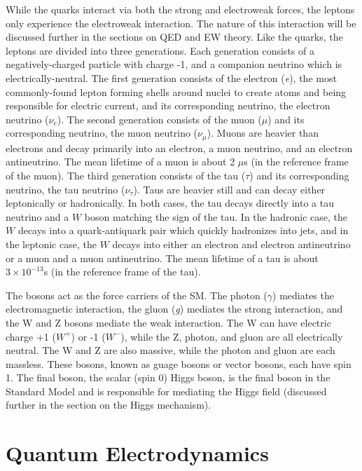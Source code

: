 While the quarks interact via both the strong and electroweak forces, the leptons only experience the electroweak interaction. The nature of this interaction will be discussed further in the sections on QED and EW theory. Like the quarks, the leptons are divided into three generations. Each generation consists of a negatively-charged particle with charge -1, and a companion neutrino which is electrically-neutral. The first generation consists of the electron (\textit{e}), the most commonly-found lepton forming shells around nuclei to create atoms and being responsible for electric current, and its corresponding neutrino, the electron neutrino (\textit{$\nu_{e}$}). The second generation consists of the muon (\textit{$\mu$}) and its corresponding neutrino, the muon neutrino (\textit{$\nu_{\mu}$}). Muons are heavier than electrons and decay primarily into an electron, a muon neutrino, and an electron antineutrino. The mean lifetime of a muon is about 2 $\mu$s (in the reference frame of the muon). The third generation consists of the tau (\textit{$\tau$}) and its corresponding neutrino, the tau neutrino (\textit{$\nu_{\tau}$}). Taus are heavier still and can decay either leptonically or hadronically. In both cases, the tau decays directly into a tau neutrino and a $W$ boson matching the sign of the tau. In the hadronic case, the $W$ decays into a quark-antiquark pair which quickly hadronizes into jets, and in the leptonic case, the $W$ decays into either an electron and electron antineutrino or a muon and a muon antineutrino.  The mean lifetime of a tau is about $3 \times 10^{-13}$s (in the reference frame of the tau)\cite{pdg}.

The bosons act as the force carriers of the SM. The photon (\textit{$\gamma$}) mediates the electromagnetic interaction, the gluon (\textit{g}) mediates the strong interaction, and the W and Z bosons mediate the weak interaction. The W can have electric charge +1 (\textit{$W^{+}$}) or -1 (\textit{$W^{-}$}), while the Z, photon, and gluon are all electrically neutral. The W and Z are also massive, while the photon and gluon are each massless. These bosons, known as guage bosons or vector bosons, each have spin 1. The final boson, the scalar (spin 0) Higgs boson, is the final boson in the Standard Model and is responsible for mediating the Higgs field (discussed further in the section on the Higgs mechanism).

\section{Quantum Electrodynamics}

